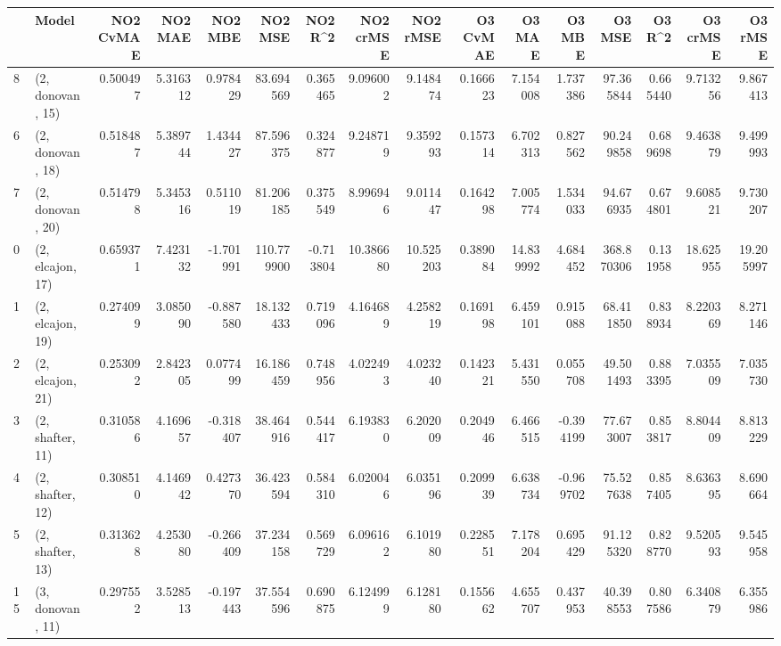 \begin{tabular}{llrrrrrrrrrrrrrr}
\toprule
{} &             Model &  NO2 CvMAE &   NO2 MAE &   NO2 MBE &     NO2 MSE &   NO2 R\textasciicircum2 &  NO2 crMSE &   NO2 rMSE &  O3 CvMAE &     O3 MAE &    O3 MBE &      O3 MSE &    O3 R\textasciicircum2 &   O3 crMSE &    O3 rMSE \\
\midrule
8  &  (2, donovan, 15) &   0.500497 &  5.316312 &  0.978429 &   83.694569 &  0.365465 &   9.096002 &   9.148474 &  0.166623 &   7.154008 &  1.737386 &   97.365844 &  0.665440 &   9.713256 &   9.867413 \\
6  &  (2, donovan, 18) &   0.518487 &  5.389744 &  1.434427 &   87.596375 &  0.324877 &   9.248719 &   9.359293 &  0.157314 &   6.702313 &  0.827562 &   90.249858 &  0.689698 &   9.463879 &   9.499993 \\
7  &  (2, donovan, 20) &   0.514798 &  5.345316 &  0.511019 &   81.206185 &  0.375549 &   8.996946 &   9.011447 &  0.164298 &   7.005774 &  1.534033 &   94.676935 &  0.674801 &   9.608521 &   9.730207 \\
0  &  (2, elcajon, 17) &   0.659371 &  7.423132 & -1.701991 &  110.779900 & -0.713804 &  10.386680 &  10.525203 &  0.389084 &  14.839992 &  4.684452 &  368.870306 &  0.131958 &  18.625955 &  19.205997 \\
1  &  (2, elcajon, 19) &   0.274099 &  3.085090 & -0.887580 &   18.132433 &  0.719096 &   4.164689 &   4.258219 &  0.169198 &   6.459101 &  0.915088 &   68.411850 &  0.838934 &   8.220369 &   8.271146 \\
2  &  (2, elcajon, 21) &   0.253092 &  2.842305 &  0.077499 &   16.186459 &  0.748956 &   4.022493 &   4.023240 &  0.142321 &   5.431550 &  0.055708 &   49.501493 &  0.883395 &   7.035509 &   7.035730 \\
3  &  (2, shafter, 11) &   0.310586 &  4.169657 & -0.318407 &   38.464916 &  0.544417 &   6.193830 &   6.202009 &  0.204946 &   6.466515 & -0.394199 &   77.673007 &  0.853817 &   8.804409 &   8.813229 \\
4  &  (2, shafter, 12) &   0.308510 &  4.146942 &  0.427370 &   36.423594 &  0.584310 &   6.020046 &   6.035196 &  0.209939 &   6.638734 & -0.969702 &   75.527638 &  0.857405 &   8.636395 &   8.690664 \\
5  &  (2, shafter, 13) &   0.313628 &  4.253080 & -0.266409 &   37.234158 &  0.569729 &   6.096162 &   6.101980 &  0.228551 &   7.178204 &  0.695429 &   91.125320 &  0.828770 &   9.520593 &   9.545958 \\
15 &  (3, donovan, 11) &   0.297552 &  3.528513 & -0.197443 &   37.554596 &  0.690875 &   6.124999 &   6.128180 &  0.155662 &   4.655707 &  0.437953 &   40.398553 &  0.807586 &   6.340879 &   6.355986 \\

\end{tabular}
